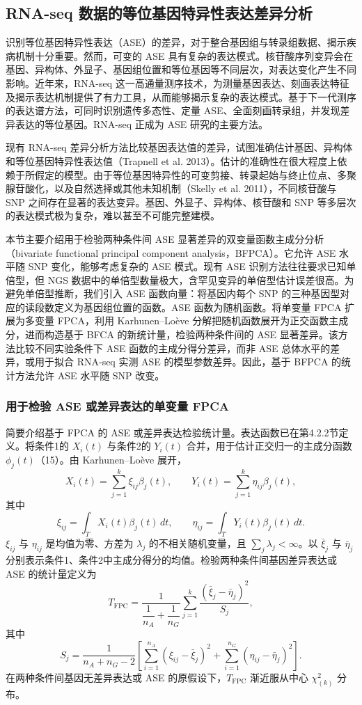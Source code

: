 \subsection{RNA-seq 数据的等位基因特异性表达差异分析}

识别等位基因特异性表达（ASE）的差异，对于整合基因组与转录组数据、揭示疾病机制十分重要。然而，可变的 ASE 具有复杂的表达模式。核苷酸序列变异会在基因、异构体、外显子、基因组位置和等位基因等不同层次，对表达变化产生不同影响。近年来，RNA-seq 这一高通量测序技术，为测量基因表达、刻画表达特征及揭示表达机制提供了有力工具，从而能够揭示复杂的表达模式。基于下一代测序的表达谱方法，可同时识别遗传多态性、定量 ASE、全面刻画转录组，并发现差异表达的等位基因。RNA-seq 正成为 ASE 研究的主要方法。

现有 RNA-seq 差异分析方法比较基因表达值的差异，试图准确估计基因、异构体和等位基因特异性表达值（Trapnell et al. 2013）。估计的准确性在很大程度上依赖于所假定的模型。由于等位基因特异性的可变剪接、转录起始与终止位点、多聚腺苷酸化，以及自然选择或其他未知机制（Skelly et al. 2011），不同核苷酸与 SNP 之间存在显著的表达变异。基因、外显子、异构体、核苷酸和 SNP 等多层次的表达模式极为复杂，难以甚至不可能完整建模。

本节主要介绍用于检验两种条件间 ASE 显著差异的双变量函数主成分分析（bivariate functional principal component analysis，BFPCA）。它允许 ASE 水平随 SNP 变化，能够考虑复杂的 ASE 模式。现有 ASE 识别方法往往要求已知单倍型，但 NGS 数据中的单倍型数量极大，含罕见变异的单倍型估计误差很高。为避免单倍型推断，我们引入 ASE 函数向量：将基因内每个 SNP 的三种基因型对应的读段数定义为基因组位置的函数。ASE 函数为随机函数。将单变量 FPCA 扩展为多变量 FPCA，利用 Karhunen–Loève 分解把随机函数展开为正交函数主成分，进而构造基于 BFCA 的新统计量，检验两种条件间的 ASE 显著差异。该方法比较不同实验条件下 ASE 函数的主成分得分差异，而非 ASE 总体水平的差异，或用于拟合 RNA-seq 实测 ASE 的模型参数差异。因此，基于 BFPCA 的统计方法允许 ASE 水平随 SNP 改变。

\subsubsection{用于检验 ASE 或差异表达的单变量 FPCA}
简要介绍基于 FPCA 的 ASE 或差异表达检验统计量。表达函数已在第4.2.2节定义。将条件1的 $X_i(t)$ 与条件2的 $Y_i(t)$ 合并，用于估计正交归一的主成分函数 $\phi_j(t)$（15）。由 Karhunen–Loève 展开，
\[
X_i(t)=\sum_{j=1}^{k}\xi_{ij}\beta_j(t),\qquad
Y_i(t)=\sum_{j=1}^{k}\eta_{ij}\beta_j(t),
\]
其中
\[
\xi_{ij}=\int_T X_i(t)\beta_j(t)\,dt,\qquad
\eta_{ij}=\int_T Y_i(t)\beta_j(t)\,dt.
\]
$\xi_{ij}$ 与 $\eta_{ij}$ 是均值为零、方差为 $\lambda_j$ 的不相关随机变量，且 $\sum_j\lambda_j<\infty$。以 $\bar\xi_j$ 与 $\bar\eta_j$ 分别表示条件1、条件2中主成分得分的均值。检验两种条件间基因差异表达或 ASE 的统计量定义为
\[
T_{\mathrm{FPC}}=\frac1{\dfrac1{n_A}+\dfrac1{n_G}}
\sum_{j=1}^{k}\frac{(\bar\xi_j-\bar\eta_j)^2}{S_j},
\]
其中
\[
S_j=\frac1{n_A+n_G-2}\left[\sum_{i=1}^{n_A}(\xi_{ij}-\bar\xi_j)^2
+\sum_{i=1}^{n_G}(\eta_{ij}-\bar\eta_j)^2\right].
\]
在两种条件间基因无差异表达或 ASE 的原假设下，$T_{\mathrm{FPC}}$ 渐近服从中心 $\chi^2_{(k)}$ 分布。

